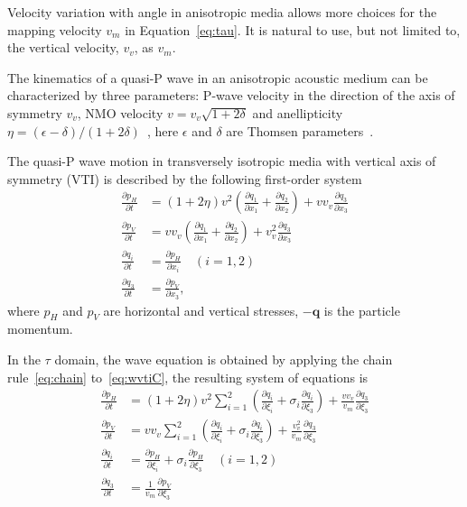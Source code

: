 Velocity variation with angle in anisotropic media allows more choices for the mapping velocity $v_m$ in Equation~\ref{eq:tau}.
It is natural to use, but not limited to, the vertical velocity, $v_v$, as $v_m$.

The kinematics of a quasi-P wave in an anisotropic acoustic medium can be characterized by three parameters: P-wave velocity in the direction of the axis of symmetry $v_v$, NMO velocity $v = v_v\sqrt{1+2\delta}$ and anellipticity $\eta = (\epsilon-\delta) / (1 + 2\delta)$~\cite[]{alkhalifah:1239}, here $\epsilon$ and $\delta$ are Thomsen parameters~\cite[]{thomsen:1954}.

The quasi-P wave motion in transversely isotropic media with vertical axis of symmetry (VTI) is described by the following first-order system~\cite[]{duveneck:S65}
\begin{align}\label{eq:wvtiC}
\frac{\partial p_H}{\partial t} & = (1+2\eta)v^2 \left(\frac{\partial q_1}{\partial x_1} + \frac{\partial q_2}{\partial x_2}\right) + v v_v\frac{\partial q_3}{\partial x_3} \nonumber \\
\frac{\partial p_V}{\partial t} & = v v_v \left(\frac{\partial q_1}{\partial x_1} + \frac{\partial q_2}{\partial x_2}\right) + v_v^2 \frac{\partial q_3}{\partial x_3} \\
\frac{\partial q_i}{\partial t} & = \frac{\partial p_H}{\partial x_i} \quad (i=1,2) \nonumber \\
\frac{\partial q_3}{\partial t} & = \frac{\partial p_V}{\partial x_3} \nonumber,
\end{align}
where $p_H$ and $p_V$ are horizontal and vertical stresses, $-\mathbf{q}$ is the particle momentum.

In the $\tau$ domain, the wave equation is obtained by applying the chain rule~\ref{eq:chain} to~\ref{eq:wvtiC}, the resulting system of equations is
\begin{align}
\label{eq:wvtiT}
\frac{\partial p_H}{\partial t} & = (1+2\eta)v^2 \sum_{i=1}^2 \left(\frac{\partial q_i}{\partial \xi_i} + \sigma_i\frac{\partial q_i}{\partial \xi_3}\right) + \frac{v v_v}{v_m} \frac{\partial q_3}{\partial \xi_3} \nonumber \\
\frac{\partial p_V}{\partial t} & = v v_v \sum_{i=1}^2 \left(\frac{\partial q_i}{\partial \xi_i} + \sigma_i\frac{\partial q_i}{\partial \xi_3}\right) + \frac{v_v^2}{v_m} \frac{\partial q_3}{\partial \xi_3} \\
\frac{\partial q_i}{\partial t} & = \frac{\partial p_H}{\partial \xi_i} + \sigma_i\frac{\partial p_H}{\partial \xi_3} \quad (i=1,2) \nonumber \\
\frac{\partial q_3}{\partial t} & = \frac{1}{v_m} \frac{\partial p_V}{\partial \xi_3} \nonumber
\end{align}

